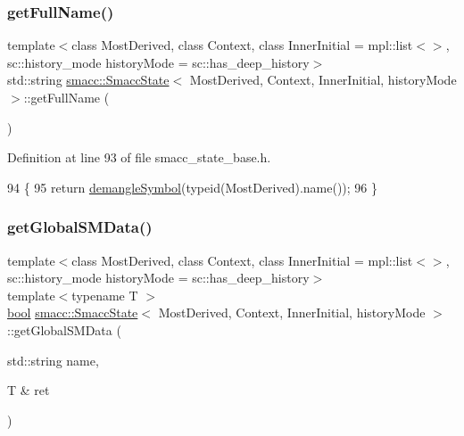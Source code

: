 \subsubsection{\texorpdfstring{get\+Full\+Name()}{getFullName()}}
{\footnotesize\ttfamily template$<$class Most\+Derived, class Context, class Inner\+Initial = mpl\+::list$<$$>$, sc\+::history\+\_\+mode history\+Mode = sc\+::has\+\_\+deep\+\_\+history$>$ \\
std\+::string \hyperlink{classsmacc_1_1SmaccState}{smacc\+::\+Smacc\+State}$<$ Most\+Derived, Context, Inner\+Initial, history\+Mode $>$\+::get\+Full\+Name (\begin{DoxyParamCaption}{ }\end{DoxyParamCaption})\hspace{0.3cm}{\ttfamily [inline]}}



Definition at line 93 of file smacc\+\_\+state\+\_\+base.\+h.


\begin{DoxyCode}
94   \{
95     \textcolor{keywordflow}{return} \hyperlink{namespacesmacc_1_1introspection_a2f495108db3e57604d8d3ff5ef030302}{demangleSymbol}(\textcolor{keyword}{typeid}(MostDerived).name());
96   \}
\end{DoxyCode}
\mbox{\label{classsmacc_1_1SmaccState_ad53b5be2760eb7ffb50f3b2e542b65f1}} 
\subsubsection{\texorpdfstring{get\+Global\+S\+M\+Data()}{getGlobalSMData()}}
{\footnotesize\ttfamily template$<$class Most\+Derived, class Context, class Inner\+Initial = mpl\+::list$<$$>$, sc\+::history\+\_\+mode history\+Mode = sc\+::has\+\_\+deep\+\_\+history$>$ \\
template$<$typename T $>$ \\
\hyperlink{classbool}{bool} \hyperlink{classsmacc_1_1SmaccState}{smacc\+::\+Smacc\+State}$<$ Most\+Derived, Context, Inner\+Initial, history\+Mode $>$\+::get\+Global\+S\+M\+Data (\begin{DoxyParamCaption}\item[{std\+::string}]{name,  }\item[{T \&}]{ret }\end{DoxyParamCaption})\hspace{0.3cm}{\ttfamily [inline]}}



